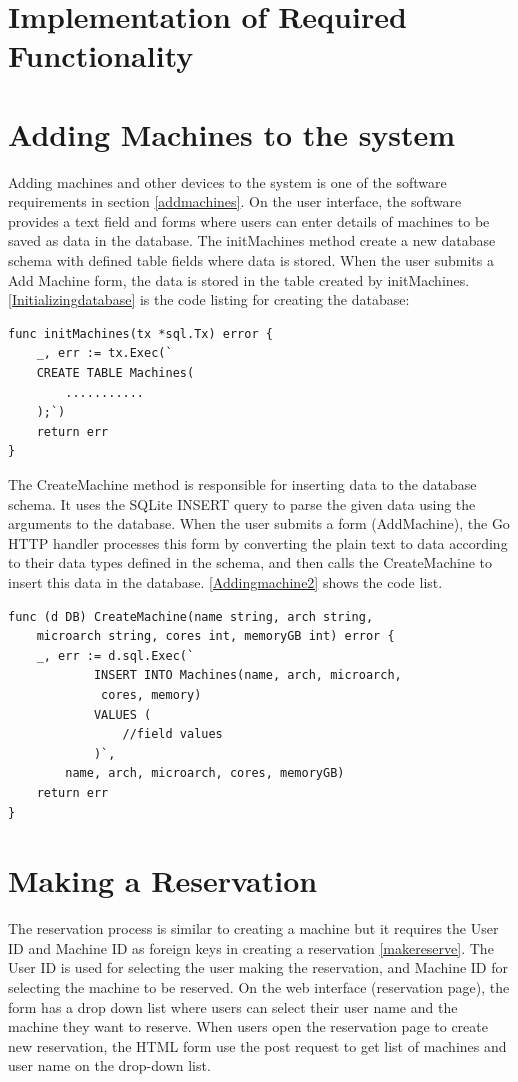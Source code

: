 \section{Implementation of Required Functionality}
\section*{Adding Machines to the system}
Adding machines and other devices to the system is one of the software requirements in section \ref{addmachines}. On the user interface, the software provides a text field and forms where users can enter details of machines to be saved as data in the database. The initMachines method create a new database schema with defined table fields where data is stored. When the user submits a Add Machine form, the data is stored in the table created by initMachines. 
 \autoref{Initializingdatabase} is the code listing for creating the database:
\lstset{basicstyle=\footnotesize\ttfamily,breaklines=true}
\lstset{framextopmargin=50pt,frame=bottomline}
\begin{lstlisting}[caption=Creating table for machines, label=Initializingdatabase]
func initMachines(tx *sql.Tx) error {
	_, err := tx.Exec(`
	CREATE TABLE Machines(
		...........
	);`)
	return err
}
\end{lstlisting}
The CreateMachine method is responsible for inserting data to the database schema. It uses the SQLite INSERT query to parse the given data using the arguments to the database. When the user submits a form (AddMachine), the Go HTTP handler processes this form by converting the plain text to data according to their data types defined in the schema, and then calls the CreateMachine to insert this data in the database. \autoref{Addingmachine2} shows the code list.
\begin{lstlisting}[caption=Adding machines details, label=Addingmachine2]
func (d DB) CreateMachine(name string, arch string,
	microarch string, cores int, memoryGB int) error {
	_, err := d.sql.Exec(`
			INSERT INTO Machines(name, arch, microarch,
			 cores, memory)
			VALUES (
				//field values
			)`,
		name, arch, microarch, cores, memoryGB)
	return err
}
\end{lstlisting}

\section*{Making a Reservation}
The reservation process is similar to creating a machine but it requires the User ID and Machine ID as foreign keys in creating a reservation \ref{makereserve}. The User ID is used for selecting the user making the reservation, and Machine ID for selecting the machine to be reserved. On the web interface (reservation page), the form has a drop down list where users can select their user name and the machine they want to reserve. When users open the reservation page to create new reservation, the HTML form use the post request to get list of machines and user name on the drop-down list.

